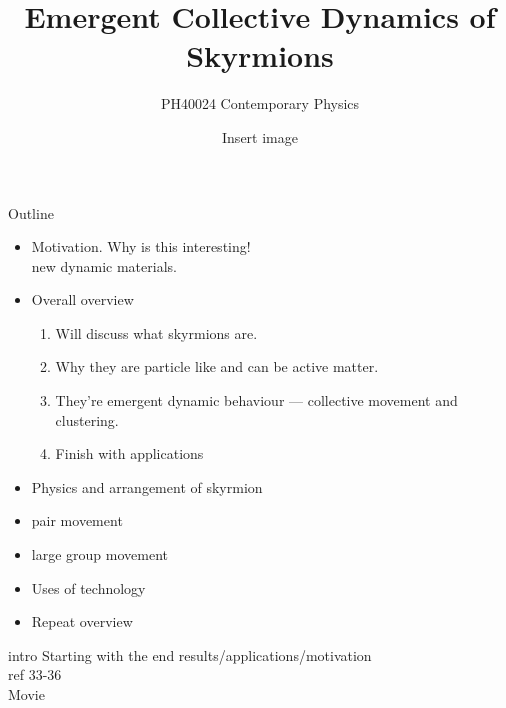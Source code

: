 \documentclass[t, 11pt, xcolor=dvipsnames]{beamer}
\subtitle{PH40024 Contemporary Physics}
\title{Emergent Collective Dynamics of Skyrmions}
\author{ Insert image } %
\date{}
\begin{document}
\begin{frame}[plain]
  \maketitle
{}
\end{frame}
\addtocounter{framenumber}{-1} %

\begin{frame}[plain]{Outline}
  \small
  \begin{itemize}
    \item Motivation. Why is this interesting! \\
      {\tiny new dynamic materials.}
    \item Overall overview \\
    \begin{enumerate}
        \tiny
        \item Will discuss what skyrmions are.  \\
        \item Why they are particle like and can be active matter. \\
        \item They're emergent dynamic behaviour --- collective movement and clustering. \\
        \item Finish with applications \\
            \end{enumerate}
    \item Physics and arrangement of skyrmion \\
    \item pair movement \\
    \item large group movement \\
    \item Uses of technology \\
    \item Repeat overview \\
  \end{itemize}
  \hypertarget<1>{slide1}{}
\end{frame}

\begin{frame}[plain]{intro}
  Starting with the end results/applications/motivation \\
  ref 33-36\\
  Movie \\
\end{frame}
\end{document}
